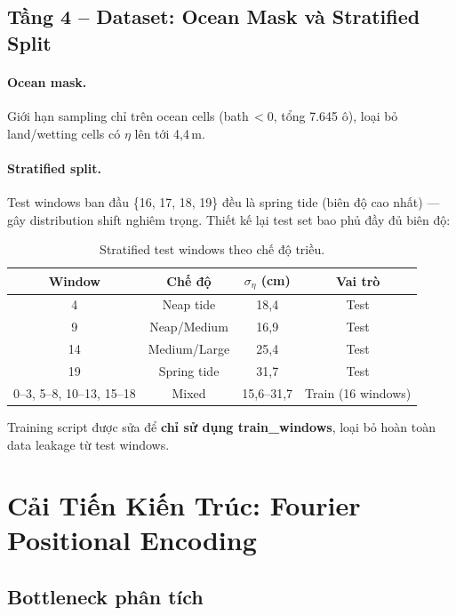\documentclass[12pt,a4paper]{article}
\begin{document}
\subsection{Tầng 4 -- Dataset: Ocean Mask và Stratified Split}

\paragraph{Ocean mask.} Giới hạn sampling chỉ trên ocean cells (bath\,$< 0$, tổng 7.645 ô), loại bỏ land/wetting cells có $\eta$ lên tới 4,4\,m.

\paragraph{Stratified split.} Test windows ban đầu \{16, 17, 18, 19\} đều là spring tide (biên độ cao nhất) --- gây distribution shift nghiêm trọng. Thiết kế lại test set bao phủ đầy đủ biên độ:

\begin{table}[ht]
  \centering
  \caption{Stratified test windows theo chế độ triều.}
  \label{tab:split}
  \begin{tabular}{@{}cccc@{}}
    \toprule
    \textbf{Window} & \textbf{Chế độ} & \textbf{$\sigma_\eta$ (cm)} & \textbf{Vai trò} \\
    \midrule
    4  & Neap tide  & 18,4 & Test \\
    9  & Neap/Medium & 16,9 & Test \\
    14 & Medium/Large & 25,4 & Test \\
    19 & Spring tide & 31,7 & Test \\
    \midrule
    0--3, 5--8, 10--13, 15--18 & Mixed & 15,6--31,7 & Train (16 windows) \\
    \bottomrule
  \end{tabular}
\end{table}

Training script được sửa để \textbf{chỉ sử dụng train\_windows}, loại bỏ hoàn toàn data leakage từ test windows.

\section{Cải Tiến Kiến Trúc: Fourier Positional Encoding}

\subsection{Bottleneck phân tích}
\end{document}
